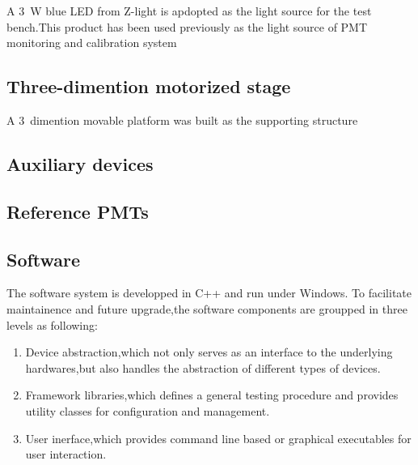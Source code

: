 \documentclass[preprint,5p,times]{elsarticle}
\begin{document}
A 3~W blue LED from Z-light\cite{zlight} is apdopted as the light source for the test bench.This product has been used previously as the light source of PMT monitoring and calibration system\cite{yuyuhong_led} 

\subsection{Three-dimention motorized stage}
\label{sec:platform}

A 3~dimention movable platform was built as the supporting structure

\subsection{Auxiliary devices}
\label{sec:integrating_sphere}

\subsection{Reference PMTs}
\label{sec:ref_pmt}

\subsection{Software}
\label{sec:software}
The software system is developped in C++ and run under Windows.
To facilitate maintainence and future upgrade,the software components are groupped in three levels as following:
\begin{enumerate}
 \item Device abstraction,which not only serves as an interface to the underlying hardwares,but also handles the abstraction of different types of devices. 
 \item Framework libraries,which defines a general testing procedure and provides utility classes for configuration and management.
 \item User inerface,which provides command line based or graphical executables for user interaction. 
\end{enumerate}
\end{document}
